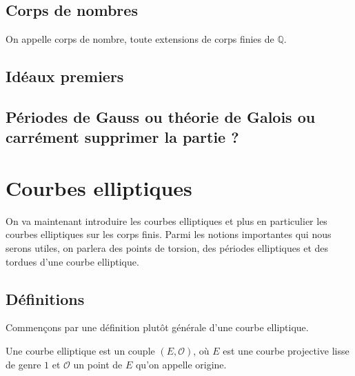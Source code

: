 \documentclass[a4paper]{article} %
\numberwithin{section}{part}
\numberwithin{equation}{section}
\newcommand\GF[1]{\mathbb{F}_{#1}}
\newcommand\QQ{\mathbb{Q}}
\newcommand\EO{\mathcal{O}}
\begin{document}
\subsection{Corps de nombres}
On appelle corps de nombre, toute extensions de corps finies de $\QQ$.

\subsection{Idéaux premiers}

\subsection[Peut-être à virer]{Périodes de Gauss ou théorie de Galois ou 
carrément supprimer la partie ?}

\section{Courbes elliptiques}
On va maintenant introduire les courbes elliptiques et plus en particulier les
courbes elliptiques sur les corps finis. Parmi les notions importantes qui nous
serons utiles, on parlera des points de torsion, des périodes elliptiques et des
tordues d'une courbe elliptique.

\subsection{Définitions}
Commençons par une définition plutôt générale d'une courbe elliptique.

\begin{defn}
Une courbe elliptique est un couple $(E, \EO)$, où $E$ est une courbe 
projective lisse de genre $1$ et $\EO$ un point de $E$ qu'on appelle origine.
\end{defn}
\end{document}
